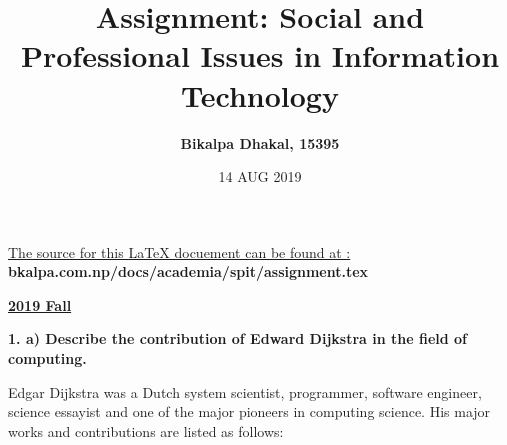 \documentclass [12pt, a4paper]{article}
\title{Assignment: Social and Professional Issues in Information Technology}
\author{\textbf{Bikalpa Dhakal, 15395}}
\date{14 AUG 2019}
\begin{document}
\begin{titlepage}
	\maketitle
	\vfill
	\underline{The source for this LaTeX docuement can be found at : }\\
	\textbf{bkalpa.com.np/docs/academia/spit/assignment.tex}
\end{titlepage}


\begin{center}
	\large
		\textbf{ \underline{2019 Fall} }
	\normalsize
\end{center}

\large
\textbf{1. a) Describe the contribution of Edward Dijkstra in the field of computing.}

\normalsize
	
Edgar Dijkstra was a Dutch system scientist, programmer, software engineer, science essayist and one of the major pioneers in computing science. His major works and contributions are listed as follows:
\end{document}

